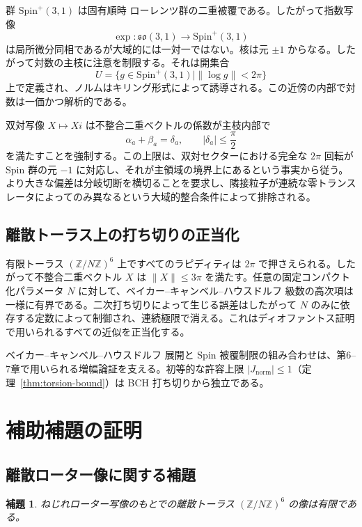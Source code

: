\documentclass[a4paper]{article}
\newtheorem{lemma}[theorem]{補題}
\theoremstyle{definition}
\theoremstyle{remark}
\newcommand{\Jnorm}{J_{\mathrm{norm}}}
\begin{document}
群 \( \mathrm{Spin}^+(3,1) \) は固有順時 ローレンツ群の二重被覆である。したがって指数写像
\[
\exp : \mathfrak{so}(3,1) \to \mathrm{Spin}^+(3,1)
\]
は局所微分同相であるが大域的には一対一ではない。核は元 \( \pm 1 \) からなる。したがって対数の主枝に注意を制限する。それは開集合
\[
U = \{ g \in \mathrm{Spin}^+(3,1) \mid \| \log g \| < 2\pi \}
\]
上で定義され、ノルムはキリング形式によって誘導される。この近傍の内部で対数は一価かつ解析的である。

双対写像 \( X \mapsto Xi \) は不整合二重ベクトルの係数が主枝内部で
\[
\alpha_a + \beta_a = \delta_a, \qquad |\delta_a| \leq \frac{\pi}{2}
\]
を満たすことを強制する。この上限は、双対セクターにおける完全な \( 2\pi \) 回転が Spin 群の元 \( -1 \) に対応し、それが主領域の境界上にあるという事実から従う。より大きな偏差は分岐切断を横切ることを要求し、隣接粒子が連続な零トランスレータによってのみ異なるという大域的整合条件によって排除される。

\subsection{離散トーラス上の打ち切りの正当化}

有限トーラス \( (\mathbb{Z}/N\mathbb{Z})^6 \) 上ですべてのラピディティは \( 2\pi \) で押さえられる。したがって不整合二重ベクトル \( X \) は \( \|X\| \leq 3\pi \) を満たす。任意の固定コンパクト化パラメータ \( N \) に対して、ベイカー–キャンベル–ハウスドルフ 級数の高次項は一様に有界である。二次打ち切りによって生じる誤差はしたがって \( N \) のみに依存する定数によって制御され、連続極限で消える。これはディオファントス証明で用いられるすべての近似を正当化する。

ベイカー–キャンベル–ハウスドルフ 展開と Spin 被覆制限の組み合わせは、第6--7章で用いられる増幅論証を支える。初等的な許容上限 \(|\Jnorm| \leq 1\)（定理~\ref{thm:torsion-bound}）は BCH 打ち切りから独立である。

\section{補助補題の証明}

\subsection{離散ローター像に関する補題}

\begin{lemma}
ねじれローター写像のもとでの離散トーラス \( (\mathbb{Z}/N\mathbb{Z})^6 \) の像は有限である。
\end{lemma}
\end{document}
